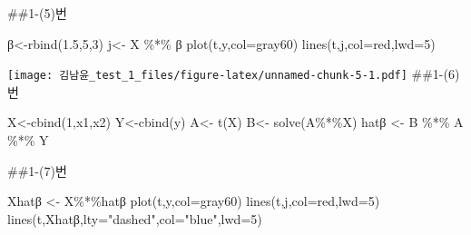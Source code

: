 \documentclass[
  12pt,
]{article}
\newenvironment{Shaded}{\begin{snugshade}}{\end{snugshade}}
\newcommand{\AttributeTok}[1]{\textcolor[rgb]{0.77,0.63,0.00}{#1}}
\newcommand{\DecValTok}[1]{\textcolor[rgb]{0.00,0.00,0.81}{#1}}
\newcommand{\FloatTok}[1]{\textcolor[rgb]{0.00,0.00,0.81}{#1}}
\newcommand{\FunctionTok}[1]{\textcolor[rgb]{0.00,0.00,0.00}{#1}}
\newcommand{\NormalTok}[1]{#1}
\newcommand{\OtherTok}[1]{\textcolor[rgb]{0.56,0.35,0.01}{#1}}
\newcommand{\SpecialCharTok}[1]{\textcolor[rgb]{0.00,0.00,0.00}{#1}}
\newcommand{\StringTok}[1]{\textcolor[rgb]{0.31,0.60,0.02}{#1}}
\begin{document}
\#\#1-(5)번

\begin{Shaded}
\begin{Highlighting}[]
\NormalTok{β}\OtherTok{\textless{}{-}}\FunctionTok{rbind}\NormalTok{(}\FloatTok{1.5}\NormalTok{,}\DecValTok{5}\NormalTok{,}\DecValTok{3}\NormalTok{)}
\NormalTok{j}\OtherTok{\textless{}{-}}\NormalTok{ X }\SpecialCharTok{\%*\%}\NormalTok{ β}
\FunctionTok{plot}\NormalTok{(t,y,}\AttributeTok{col=}\StringTok{\textquotesingle{}gray60\textquotesingle{}}\NormalTok{)}
\FunctionTok{lines}\NormalTok{(t,j,}\AttributeTok{col=}\StringTok{\textquotesingle{}red\textquotesingle{}}\NormalTok{,}\AttributeTok{lwd=}\StringTok{\textquotesingle{}5\textquotesingle{}}\NormalTok{)}
\end{Highlighting}
\end{Shaded}

\texttt{[image: 김남윤\_test\_1\_files/figure-latex/unnamed-chunk-5-1.pdf]}
\#\#1-(6)번

\begin{Shaded}
\begin{Highlighting}[]
\NormalTok{X}\OtherTok{\textless{}{-}}\FunctionTok{cbind}\NormalTok{(}\DecValTok{1}\NormalTok{,x1,x2)}
\NormalTok{Y}\OtherTok{\textless{}{-}}\FunctionTok{cbind}\NormalTok{(y)}
\NormalTok{A}\OtherTok{\textless{}{-}} \FunctionTok{t}\NormalTok{(X)}
\NormalTok{B}\OtherTok{\textless{}{-}} \FunctionTok{solve}\NormalTok{(A}\SpecialCharTok{\%*\%}\NormalTok{X)}
\NormalTok{hatβ }\OtherTok{\textless{}{-}}\NormalTok{ B }\SpecialCharTok{\%*\%}\NormalTok{ A }\SpecialCharTok{\%*\%}\NormalTok{ Y}
\end{Highlighting}
\end{Shaded}

\#\#1-(7)번

\begin{Shaded}
\begin{Highlighting}[]
\NormalTok{Xhatβ }\OtherTok{\textless{}{-}}\NormalTok{ X}\SpecialCharTok{\%*\%}\NormalTok{hatβ}
\FunctionTok{plot}\NormalTok{(t,y,}\AttributeTok{col=}\StringTok{\textquotesingle{}gray60\textquotesingle{}}\NormalTok{)}
\FunctionTok{lines}\NormalTok{(t,j,}\AttributeTok{col=}\StringTok{\textquotesingle{}red\textquotesingle{}}\NormalTok{,}\AttributeTok{lwd=}\StringTok{\textquotesingle{}5\textquotesingle{}}\NormalTok{)}
\FunctionTok{lines}\NormalTok{(t,Xhatβ,}\AttributeTok{lty=}\StringTok{"dashed"}\NormalTok{,}\AttributeTok{col=}\StringTok{"blue"}\NormalTok{,}\AttributeTok{lwd=}\StringTok{\textquotesingle{}5\textquotesingle{}}\NormalTok{)}
\end{Highlighting}
\end{Shaded}
\end{document}
